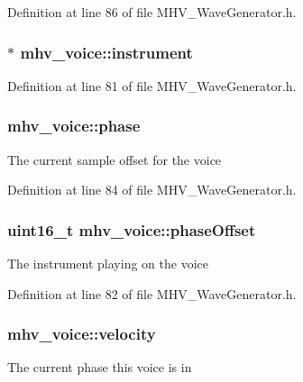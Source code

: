 \-Definition at line 86 of file \-M\-H\-V\-\_\-\-Wave\-Generator.\-h.

\hypertarget{structmhv__voice_ad13f45665cd3e683530f21ac2824aa5d}{
\subsubsection[{instrument}]{$\ast$ {\bf mhv\-\_\-voice\-::instrument}}}
\label{structmhv__voice_ad13f45665cd3e683530f21ac2824aa5d}


\-Definition at line 81 of file \-M\-H\-V\-\_\-\-Wave\-Generator.\-h.

\hypertarget{structmhv__voice_acb00a6c0fe99ecfebb9f5b1ed66c51be}{
\subsubsection[{phase}]{ {\bf mhv\-\_\-voice\-::phase}}}
\label{structmhv__voice_acb00a6c0fe99ecfebb9f5b1ed66c51be}
\-The current sample offset for the voice 

\-Definition at line 84 of file \-M\-H\-V\-\_\-\-Wave\-Generator.\-h.

\hypertarget{structmhv__voice_a24e2f2d4a979d1f00b338b48f741c217}{
\subsubsection[{phase\-Offset}]{\setlength{\rightskip}{0pt plus 5cm}uint16\-\_\-t {\bf mhv\-\_\-voice\-::phase\-Offset}}}
\label{structmhv__voice_a24e2f2d4a979d1f00b338b48f741c217}
\-The instrument playing on the voice 

\-Definition at line 82 of file \-M\-H\-V\-\_\-\-Wave\-Generator.\-h.

\hypertarget{structmhv__voice_a8f99a4e928e8698be419b3863232bc62}{
\subsubsection[{velocity}]{ {\bf mhv\-\_\-voice\-::velocity}}}
\label{structmhv__voice_a8f99a4e928e8698be419b3863232bc62}
\-The current phase this voice is in 

